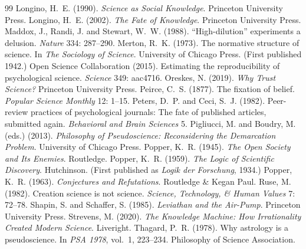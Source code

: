 \documentclass{situationist-preprint}
\begin{document}
\begin{thebibliography}{99}
 Longino, H.~E. (1990). \emph{Science as Social Knowledge}. Princeton University Press.
 Longino, H.~E. (2002). \emph{The Fate of Knowledge}. Princeton University Press.
 Maddox, J., Randi, J. and Stewart, W.~W. (1988). \enquote{High-dilution} experiments a delusion. \emph{Nature} 334: 287--290.
 Merton, R.~K. (1973). The normative structure of science. In \emph{The Sociology of Science}. University of Chicago Press. (First published 1942.)
 Open Science Collaboration (2015). Estimating the reproducibility of psychological science. \emph{Science} 349: aac4716.
 Oreskes, N. (2019). \emph{Why Trust Science?} Princeton University Press.
 Peirce, C.~S. (1877). The fixation of belief. \emph{Popular Science Monthly} 12: 1--15.
 Peters, D.~P. and Ceci, S.~J. (1982). Peer-review practices of psychological journals: The fate of published articles, submitted again. \emph{Behavioral and Brain Sciences} 5.
 Pigliucci, M. and Boudry, M. (eds.) (2013). \emph{Philosophy of Pseudoscience: Reconsidering the Demarcation Problem}. University of Chicago Press.
 Popper, K.~R. (1945). \emph{The Open Society and Its Enemies}. Routledge.
 Popper, K.~R. (1959). \emph{The Logic of Scientific Discovery}. Hutchinson. (First published as \emph{Logik der Forschung}, 1934.)
 Popper, K.~R. (1963). \emph{Conjectures and Refutations}. Routledge \& Kegan Paul.
 Ruse, M. (1982). Creation science is not science. \emph{Science, Technology, \& Human Values} 7: 72--78.
 Shapin, S. and Schaffer, S. (1985). \emph{Leviathan and the Air-Pump}. Princeton University Press.
 Strevens, M. (2020). \emph{The Knowledge Machine: How Irrationality Created Modern Science}. Liveright.
 Thagard, P.~R. (1978). Why astrology is a pseudoscience. In \emph{PSA 1978}, vol.~1, 223--234. Philosophy of Science Association.
\end{thebibliography}
\end{document}
